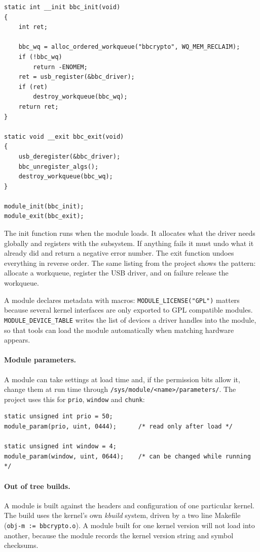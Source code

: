 \documentclass[11pt,a4paper,oneside]{report}
\newcommand{\code}[1]{\texttt{\small #1}}
\begin{document}
\begin{lstlisting}
static int __init bbc_init(void)
{
	int ret;

	bbc_wq = alloc_ordered_workqueue("bbcrypto", WQ_MEM_RECLAIM);
	if (!bbc_wq)
		return -ENOMEM;
	ret = usb_register(&bbc_driver);
	if (ret)
		destroy_workqueue(bbc_wq);
	return ret;
}

static void __exit bbc_exit(void)
{
	usb_deregister(&bbc_driver);
	bbc_unregister_algs();
	destroy_workqueue(bbc_wq);
}

module_init(bbc_init);
module_exit(bbc_exit);
\end{lstlisting}

The init function runs when the module loads. It allocates what the driver needs globally and registers with the subsystem. If anything fails it must undo what it already did and return a negative error number. The exit function undoes everything in reverse order. The same listing from the project shows the pattern: allocate a workqueue, register the USB driver, and on failure release the workqueue.

A module declares metadata with macros: \code{MODULE\_LICENSE("GPL")} matters because several kernel interfaces are only exported to GPL compatible modules. \code{MODULE\_DEVICE\_TABLE} writes the list of devices a driver handles into the module, so that tools can load the module automatically when matching hardware appears.

\paragraph{Module parameters.} A module can take settings at load time and, if the permission bits allow it, change them at run time through \code{/sys/module/<name>/parameters/}. The project uses this for \code{prio}, \code{window} and \code{chunk}:

\begin{lstlisting}
static unsigned int prio = 50;
module_param(prio, uint, 0444);      /* read only after load */

static unsigned int window = 4;
module_param(window, uint, 0644);    /* can be changed while running */
\end{lstlisting}

\paragraph{Out of tree builds.} A module is built against the headers and configuration of one particular kernel. The build uses the kernel's own \emph{kbuild} system, driven by a two line Makefile (\code{obj-m := bbcrypto.o}). A module built for one kernel version will not load into another, because the module records the kernel version string and symbol checksums.
\end{document}
